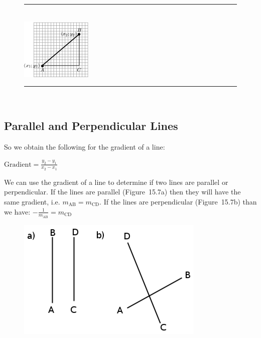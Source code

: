 	\begin{figure}[H] %
    \begin{center}
    \rule[.1in]{\figurerulewidth}{.005in} \\
        \label{m39108*uid42!!!underscore!!!media}\label{m39108*uid42!!!underscore!!!printimage}\includegraphics{col11306.imgs/m39108_MG10C14_018.png} %
      \vspace{2pt}
    \vspace{.1in}
    \rule[.1in]{\figurerulewidth}{.005in} \\
    \end{center}
 \end{figure}   \subsection{Parallel and Perpendicular Lines}    
        \label{m39108*eip-127}So we obtain the following for the gradient of a line:\par \label{m39108*id68147}$\mathrm{Gradient}=\frac{{y}_{2}-{y}_{1}}{{x}_{2}-{x}_{1}}$\par 
        \label{m39108*eip-332}We can use the gradient of a line to determine if two lines are parallel or perpendicular. If the lines are parallel (Figure~15.7a) then they will have the same gradient, i.e. ${m}_{\mathrm{AB}}={m}_{\mathrm{CD}}$. If the lines are perpendicular (Figure~15.7b) than we have: $-\frac{1}{{m}_{\mathrm{AB}}}={m}_{\mathrm{CD}}$
    \setcounter{subfigure}{0}
	\begin{figure}[H] %
    \begin{center}
    \label{m39108*uid4212!!!underscore!!!media}\label{m39108*uid4212!!!underscore!!!printimage}\includegraphics[width=0.4\columnwidth]{col11306.imgs/m39108_geom.png} %
      \vspace{2pt}
    \vspace{.1in}
    \end{center}
 \end{figure}       
